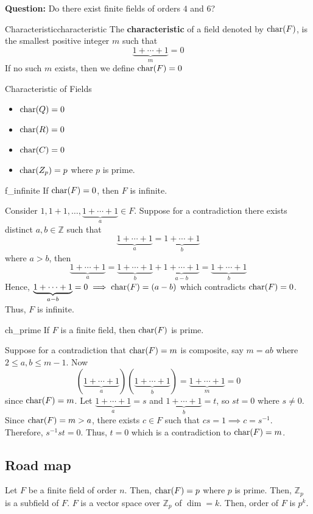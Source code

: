 \textbf{Question:} Do there exist finite fields of orders $ 4 $ and $ 6 $?

\begin{Definition}{Characteristic}{characteristic}
    The \textbf{characteristic} of a field denoted by $ \operatorname{char}(F) $, is the smallest
    positive integer $ m $ such that
    \[ \underbrace{1+\cdots+1}_{m}=0 \]
    If no such $ m $ exists, then we define $ \operatorname{char}(F)=0 $
\end{Definition}

\begin{Example}{Characteristic of Fields}{}
    \begin{itemize}
        \item $ \operatorname{char}(\relax{Q})=0 $
        \item $ \operatorname{char}(\relax{R})=0 $
        \item $ \operatorname{char}(\relax{C})=0 $
        \item $ \operatorname{char}(\relax{Z}_p)=p $ where $ p $ is prime.
    \end{itemize}
\end{Example}

\begin{Theorem}{}{f_infinite}
    If $ \operatorname{char}(F)=0 $, then $ F $ is infinite.
\end{Theorem}

\begin{Proof}{}{}
    Consider $ 1,1+1,\ldots,\underbrace{1+\cdots+1}_{a}\in F $.
    Suppose for a contradiction there exists distinct $ a,b\in\mathbb{Z} $
    such that
    \[ \underbrace{1+\cdots+1}_{a}=\underbrace{1+\cdots+1}_{b} \]
    where $ a>b $, then
    \[ \underbrace{1+\cdots+1}_{a}=\underbrace{1+\cdots+1}_{b}+
        \underbrace{1+\cdots+1}_{a-b}=\underbrace{1+\cdots+1}_{b} \]
    Hence, $ \underbrace{1+\cdots+1}_{a-b}=0\implies \operatorname{char}(F)=(a-b) $
    which contradicts $ \operatorname{char}(F)=0 $. Thus, $ F $ is infinite.
\end{Proof}

\begin{Theorem}{}{ch_prime}
    If $ F $ is a finite field, then $ \operatorname{char}(F) $ is prime.
\end{Theorem}

\begin{Proof}{}{}
    Suppose for a contradiction that $ \operatorname{char}(F)=m $ is composite,
    say $ m=ab $ where
    $ 2\leqslant a,b\leqslant m-1 $. Now
    \[ (\underbrace{1+\cdots+1}_{a})(\underbrace{1+\cdots+1}_{b})
        =\underbrace{1+\cdots+1}_{m}=0 \]
    since $ \operatorname{char}(F)=m $. Let $ \underbrace{1+\cdots+1}_{a}=s $
    and $ \underbrace{1+\cdots+1}_{b}=t $, so $ st=0 $ where $ s\neq 0 $.
    Since $ \operatorname{char}(F)=m>a $, there exists $ c\in F $ such that
    $ cs=1 \implies c=s^{-1} $. Therefore, $ s^{-1}st=0 $. Thus,
    $ t=0 $ which is a contradiction to $ \operatorname{char}(F)=m $.
\end{Proof}

\subsection*{Road map} Let $ F $ be a finite field of order $ n $.
Then, $ \operatorname{char}(F)=p $ where $ p $ is prime. Then, $ \mathbb{Z}_p $ is a subfield
of $ F $. $ F $ is a vector space over $ \mathbb{Z}_p $ of $ \dim=k $.
Then, order of $ F $ is $ p^k $.
